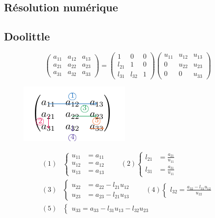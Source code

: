 \documentclass[]{article}
\begin{document}
\begin{multicols}{3}
\section{Résolution numérique}
\subsection{Doolittle}
$$\begin{pmatrix}
a_{11} & a_{12} & a_{13}\\
a_{21} & a_{22} & a_{23}\\
a_{31} & a_{32} & a_{33}
\end{pmatrix}=\begin{pmatrix}
1 & 0 & 0\\
l_{21} & 1 & 0\\
l_{31} & l_{32} & 1
\end{pmatrix}\begin{pmatrix}
u_{11} & u_{12} & u_{13}\\
0 & u_{22} & u_{23}\\
0 & 0 & u_{33}
\end{pmatrix}$$
\begin{figure}[H]
\centering
\includegraphics[scale=1,page=1]{drwg_3.pdf}
\end{figure}
\begin{align*}
(1)&\begin{cases}
u_{11}&=a_{11}\\
u_{12}&=a_{12}\\
u_{13}&=a_{13}
\end{cases} \qquad (2)\begin{cases}
l_{21}&=\frac{a_{21}}{u_{11}}\\
l_{31}&=\frac{a_{31}}{u_{11}}
\end{cases}\\
(3)&\begin{cases}
u_{22}&=a_{22}-l_{21}u_{12}\\
u_{23}&=a_{23}-l_{21}u_{13}
\end{cases} \qquad(4)\begin{cases}
l_{32}=\frac{a_{32}-l_{31}u_{12}}{u_{22}}
\end{cases}\\
(5)&\begin{cases}u_{33}=a_{33}-l_{31}u_{13}-l_{32}u_{23}\end{cases}
\end{align*}

\end{multicols}
\end{document}
